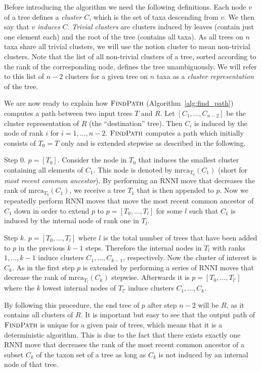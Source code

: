 \documentclass{amsart}
\newcommand{\mrca}{\mathrm{mrca}}
\newcommand{\rnni}{\mathrm{RNNI}}
\newcommand{\findpath}{\textsc{FindPath}}
\begin{document}
Before introducing the algorithm we need the following definitions.
Each node $v$ of a tree defines a \emph{cluster} $C$, which is the set of taxa descending from $v$.
We then say that $v$ \emph{induces} $C$.
\emph{Trivial clusters} are clusters induced by leaves (contain just one element each) and the root of the tree (contains all taxa).
As all trees on $n$ taxa share all trivial clusters, we will use the notion cluster to mean non-trivial clusters.
Note that the list of all non-trivial clusters of a tree, sorted according to the rank of the corresponding node, defines the tree unambiguously.
We will refer to this list of $n-2$ clusters for a given tree on $n$ taxa as a \emph{cluster representation} of the tree.

We are now ready to explain how $\findpath$ (Algorithm~\ref{alg:find_path}) computes a path between two input trees $T$ and $R$.
Let $[C_1, \ldots, C_{n-2}]$ be the cluster representation of $R$ (the ``destination'' tree).
Then $C_i$ is induced by the node of rank $i$ for $i = 1, \ldots, n-2$.
$\findpath$ computes a path which initially consists of $T_0 = T$ only and is extended stepwise as described in the following.

Step $0$.
$p = [T_0]$.
Consider the node in $T_0$ that induces the smallest cluster containing all elements of $C_1$.
This node is denoted by $\mrca_{T_0}(C_1)$ (short for \emph{most recent common ancestor}).
By performing an $\rnni$ move that decreases the rank of $\mrca_{T_0}(C_1)$, we receive a tree $T_1$ that is then appended to $p$.
Now we repeatedly perform $\rnni$ moves that move the most recent common ancestor of $C_1$ down in order to extend $p$ to $p = [T_0, \ldots, T_l]$ for some $l$ such that $C_1$ is induced by the internal node of rank one in $T_l$.

Step $k$.
$p = [T_0, \ldots, T_l]$ where $l$ is the total number of trees that have been added to $p$ in the previous $k-1$ steps.
Therefore the internal nodes in $T_l$ with ranks $1, \ldots, k-1$ induce clusters $C_1, \ldots, C_{k-1}$, respectively.
Now the cluster of interest is $C_k$.
As in the first step $p$ is extended by performing a series of $\rnni$ moves that decrease the rank of $\mrca_{T_l}(C_k)$ stepwise.
Afterwards it is $p = [T_0, \ldots, T_{l'}]$ where the $k$ lowest internal nodes of $T_{l'}$ induce clusters $C_1, \ldots, C_{k}$.

By following this procedure, the end tree of $p$ after step $n-2$ will be $R$, as it contains all clusters of $R$.
It is important but easy to see that the output path of $\findpath$ is unique for a given pair of trees, which means that it is a deterministic algorithm.
This is due to the fact that there exists exactly one $\rnni$ move that decreases the rank of the most recent common ancestor of a subset $C_k$ of the taxon set of a tree as long as $C_k$ is not induced by an internal node of that tree.
\end{document}
